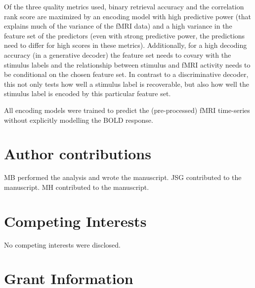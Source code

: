 Of the three quality metrics used, binary retrieval accuracy and the correlation rank score are maximized by an encoding model with high predictive power (that explains much of the variance of the f{MRI} data) and a high variance in the feature set of the predictors (even with strong predictive power, the predictions need to differ for high scores in these metrics). Additionally, for a high decoding accuracy (in a generative decoder) the feature set needs to covary with the stimulus labels and the relationship between stimulus and f{MRI} activity needs to be conditional on the chosen feature set. In contrast to a discriminative decoder, this not only tests how well a stimulus label is recoverable, but also how well the stimulus label is encoded by this particular feature set.

All encoding models were trained to predict the (pre-processed) f{MRI} time-series without explicitly modelling the BOLD response. 







\section*{Author contributions}

MB performed the analysis and wrote the manuscript.
JSG contributed to the manuscript.
MH contributed to the manuscript.


\section*{Competing Interests}
No competing interests were disclosed.

\section*{Grant Information}

